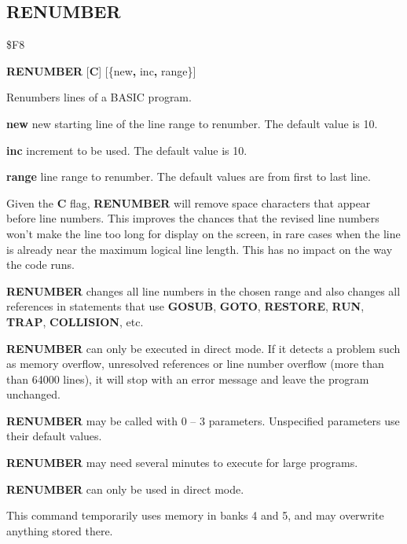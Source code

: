 \subsection{RENUMBER}
\begin{description}[leftmargin=2cm,style=nextline]
\item [Token:]    \$F8

\item [Format:]   {\bf RENUMBER} [{\bf C}] [\{new{\bf,} inc{\bf,} range\}]

\item [Usage:]    Renumbers lines of a BASIC program.

                  {\bf new} new starting line of the line range to renumber. The default value is 10.

                  {\bf inc} increment to be used. The default value is 10.

                  {\bf range} line range to renumber. The default values are from first to last line.

                  Given the {\bf C} flag, {\bf RENUMBER} will remove space characters that appear before line numbers. This improves the chances that the revised line numbers won't make the line too long for display on the screen, in rare cases when the line is already near the maximum logical line length. This has no impact on the way the code runs.

                  {\bf RENUMBER} changes all line numbers in the chosen range and also changes all references in statements that use {\bf GOSUB}, {\bf GOTO}, {\bf RESTORE}, {\bf RUN}, {\bf TRAP}, {\bf COLLISION}, etc.

                  {\bf RENUMBER} can only be executed in direct mode. If it detects a problem such as memory overflow, unresolved references or line number overflow (more than than 64000 lines), it will stop with an error message and leave the program unchanged.

                  {\bf RENUMBER} may be called with 0 -- 3 parameters. Unspecified parameters use their default values.

\item [Remarks:]  {\bf RENUMBER} may need several minutes to execute for large programs.

                  {\bf RENUMBER} can only be used in direct mode.

                  This command temporarily uses memory in banks 4 and 5, and may overwrite anything stored there.


\end{description}
